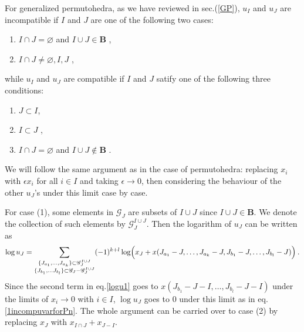 \documentclass[hidelinks,12pt]{article}
\begin{document}
For generalized permutohedra, as we have reviewed in sec.(\ref{GP}), $u_{I}$ and $u_{J}$ are incompatible if $I$ and $J$ are one of the following two cases:
\begin{enumerate}[label=(\arabic*)]
   \item $I\cap J=\varnothing$ and $I\cup J \in \mathbf{B}$ \:, 
   \item $I\cap J \neq \varnothing,I, J $ \:,
\end{enumerate}
while $u_{I}$ and $u_{J}$ are compatible if $I$ and $J$ satify one of the following three conditions:
\begin{enumerate}[resume,label=(\arabic*)]
   \item $J\subset I$\:,
   \item $I\subset J$ \:,
   \item $I\cap J=\varnothing$ and $I\cup J \notin \mathbf{B}$ \:.
\end{enumerate}
We will follow the same argument as in the case of permutohedra: replacing $x_{i}$ with $ \epsilon x_{i}$ for all $i\in I$ and taking $\epsilon \to 0$, then considering the behaviour of the other $u_{J}$'s under this limit case by case. 

For case (1), some elements in $\mathscr{G}_{J}$ are subsets of $I\cup J$ since $I\cup J \in \mathbf{B}$. We denote the collection of such elements by $\mathscr{G}^{I\cup J}_{J}$. Then the logarithm of $u_{J}$ can be written as 
\begin{equation}
   \log u_{J}= \sum_{\substack {\{J_{a_{1}},\ldots,J_{a_{k}}\}\subset \mathscr{G}^{I\cup J}_{J}\\ \{J_{b_{1}},\ldots J_{b_{l}}\}\subset \mathscr{G}_{J}-\mathscr{G}^{I\cup J}_{J}}}(-1)^{k+l}\log\Bigl( x_{J}+ x(J_{a_{1}}-J,\ldots,J_{a_{k}}-J, J_{b_{1}}-J,\ldots, J_{b_{l}}-J)\Bigr) \:. \label{logu1}
\end{equation}
Since the second term in eq.\eqref{logu1} goes to $x(J_{b_{1}}-J-I,\ldots, J_{b_{l}}-J-I)$ under the limits of $x_{i}\to 0$ with $i\in I$, $\log u_{J}$ goes to 0 under this limit as in eq.\eqref{1incompuvarforPn}. The whole argument can be carried over to case (2) by replacing $x_{J}$ with $x_{I\cap J}+ x_{J-I}$.
\end{document}
